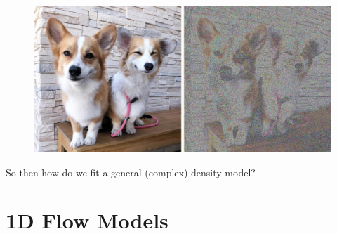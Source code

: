 \documentclass{report}
\begin{document}
\begin{concept}
    \begin{figure}[H]
        \centering
        \includegraphics[width=1.0\textwidth]{.././assets/10.2.png}
    \end{figure}

    So then how do we fit a general (complex) density model?
\end{concept}

\section{1D Flow Models}
\end{document}
